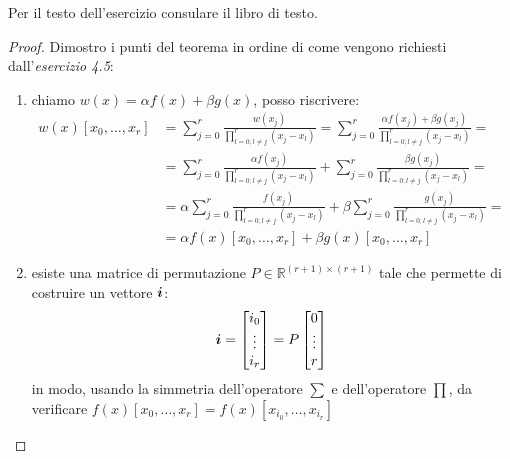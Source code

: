 \begin{exercise}[4.5] 
Per il testo dell'esercizio consulare il libro di testo.
\end{exercise}
\begin{proof} Dimostro i punti del teorema in ordine di come vengono richiesti
dall'\emph{esercizio 4.5}:
\begin{enumerate}
  \item chiamo $w(x) = \alpha f(x) + \beta g(x)$, posso riscrivere:
  \begin{displaymath}
  \begin{split}
  	w(x)[x_{0}, \ldots, x_{r}] &= \sum_{j = 0}^{r}{
  		\frac{w(x_{j})}{\prod_{l = 0;l \not = j}^{r}{(x_{j} - x_{l})}}} = 
  		\sum_{j = 0}^{r}{
  		\frac{\alpha f(x_{j}) + \beta g(x_{j})}{\prod_{l = 0;l \not = j}^{r}{(x_{j}
  		- x_{l})}}} =\\
  	&= \sum_{j = 0}^{r}{
  		\frac{\alpha f(x_{j})}{\prod_{l = 0;l \not = j}^{r}{(x_{j} - x_{l})}}} +
  		\sum_{j = 0}^{r}{
  		\frac{\beta g(x_{j})}{\prod_{l = 0;l \not = j}^{r}{(x_{j} - x_{l})}}} = \\
  	&=	\alpha \sum_{j = 0}^{r}{
  		\frac{ f(x_{j})}{\prod_{l = 0;l \not = j}^{r}{(x_{j} - x_{l})}}} +
  		\beta \sum_{j = 0}^{r}{
  		\frac{ g(x_{j})}{\prod_{l = 0;l \not = j}^{r}{(x_{j} - x_{l})}}} = \\
  	&=	\alpha f(x)[x_{0}, \ldots, x_{r}] + \beta g(x)[x_{0}, \ldots, x_{r}]
  \end{split}
  \end{displaymath}
  
  \item esiste una matrice di permutazione $P \in \mathbb{R}^{(r+1) \times
  (r+1)}$ tale che permette di costruire un vettore $\boldsymbol{i}$:
  \begin{displaymath}
  	\boldsymbol{i} = \begin{bmatrix}
  		i_{0} \\ 
  		\vdots \\
  		i_{r}
  	\end{bmatrix} = P\begin{bmatrix}
  		0 \\ 
  		\vdots \\
  		r
  	\end{bmatrix}
  \end{displaymath}
  in modo, usando la simmetria dell'operatore $\sum$ e dell'operatore $\prod$, 
  da verificare $f(x)[x_{0}, \ldots, x_{r}] = f(x)[x_{i_{0}}, \ldots,
  x_{i_{r}}]$
  

\end{enumerate}
\end{proof}
